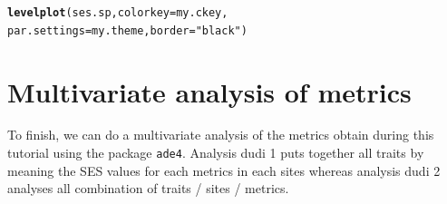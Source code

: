 \documentclass[12pt]{article}\usepackage[]{graphicx}\usepackage[]{color}
\makeatletter
\newcommand{\hlstr}[1]{\textcolor[rgb]{0.192,0.494,0.8}{#1}}%
\newcommand{\hlstd}[1]{\textcolor[rgb]{0.345,0.345,0.345}{#1}}%
\newcommand{\hlkwc}[1]{\textcolor[rgb]{0.333,0.667,0.333}{#1}}%
\newcommand{\hlkwd}[1]{\textcolor[rgb]{0.737,0.353,0.396}{\textbf{#1}}}%
\newenvironment{kframe}{%
 \def\at@end@of@kframe{}%
 \ifinner\ifhmode%
  \def\at@end@of@kframe{\end{minipage}}%
  \begin{minipage}{\columnwidth}%
 \fi\fi%
 \def\FrameCommand##1{\hskip\@totalleftmargin \hskip-\fboxsep
 \colorbox{shadecolor}{##1}\hskip-\fboxsep
     \hskip-\linewidth \hskip-\@totalleftmargin \hskip\columnwidth}%
 \MakeFramed {\advance\hsize-\width
   \@totalleftmargin\z@ \linewidth\hsize
   \@setminipage}}%
 {\par\unskip\endMakeFramed%
 \at@end@of@kframe}
\newenvironment{knitrout}{}{} %
\makeatother
\begin{document}
\begin{knitrout}
\begin{kframe}
{\ttfamily\noindent\bfseries\color{errorcolor}{\#\# Error: erreur d'évaluation de l'argument 'x' lors de la sélection d'une méthode pour la fonction 'levelplot' : Erreur : objet 'ses.ind' introuvable}}\begin{alltt}
\hlkwd{levelplot}\hlstd{(ses.sp,} \hlkwc{colorkey} \hlstd{= my.ckey,}
     \hlkwc{par.settings} \hlstd{= my.theme,}\hlkwc{border} \hlstd{=} \hlstr{"black"}\hlstd{)}
\end{alltt}


{\ttfamily\noindent\bfseries\color{errorcolor}{\#\# Error: erreur d'évaluation de l'argument 'x' lors de la sélection d'une méthode pour la fonction 'levelplot' : Erreur : objet 'ses.sp' introuvable}}\end{kframe}
\end{knitrout}

\section{Multivariate analysis of metrics}
To finish, we can do a multivariate analysis of the metrics obtain during this tutorial using the package \texttt{ade4}. Analysis dudi 1 puts together all traits by meaning the SES values for each metrics in each sites whereas analysis dudi 2 analyses all combination of traits / sites / metrics.
\end{document}
